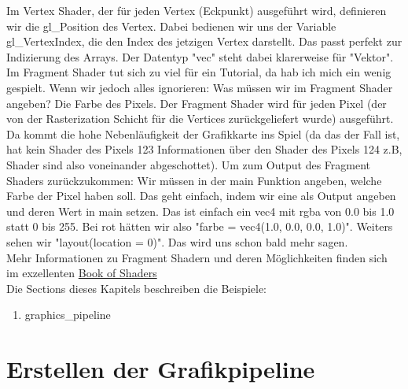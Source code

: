 \documentclass[11pt,a4paper]{report}
\begin{document}
\newpage
Im Vertex Shader, der für jeden Vertex (Eckpunkt) ausgeführt wird, definieren wir die gl\_Position des Vertex. Dabei bedienen wir uns der Variable gl\_VertexIndex, die den Index des jetzigen Vertex darstellt. Das passt perfekt zur Indizierung des Arrays. Der Datentyp "vec" steht dabei klarerweise für "Vektor".\\
Im Fragment Shader tut sich zu viel für ein Tutorial, da hab ich mich ein wenig gespielt. Wenn wir jedoch alles ignorieren: Was müssen wir im Fragment Shader angeben? Die Farbe des Pixels. Der Fragment Shader wird für jeden Pixel (der von der Rasterization Schicht für die Vertices zurückgeliefert wurde) ausgeführt. Da kommt die hohe Nebenläufigkeit der Grafikkarte ins Spiel (da das der Fall ist, hat kein Shader des Pixels 123 Informationen über den Shader des Pixels 124 z.B, Shader sind also voneinander abgeschottet). Um zum Output des Fragment Shaders zurückzukommen: Wir müssen in der main Funktion angeben, welche Farbe der Pixel haben soll. Das geht einfach, indem wir eine als Output angeben und deren Wert in main setzen. Das ist einfach ein vec4 mit rgba von 0.0 bis 1.0 statt 0 bis 255. Bei rot hätten wir also "farbe = vec4(1.0, 0.0, 0.0, 1.0)". Weiters sehen wir "layout(location = 0)". Das wird uns schon bald mehr sagen.\\
Mehr Informationen zu Fragment Shadern und deren Möglichkeiten finden sich im exzellenten \href{https://thebookofshaders.com/}{Book of Shaders}\\
Die Sections dieses Kapitels beschreiben die Beispiele:
\begin{enumerate}
	\item{graphics\_pipeline}
\end{enumerate}

\section{Erstellen der Grafikpipeline}
\end{document}
